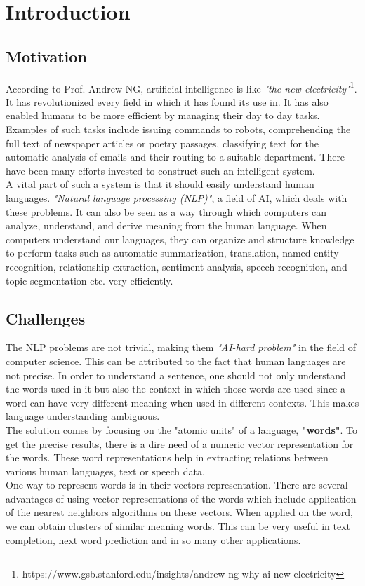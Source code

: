 \chapter{Introduction}
\label{cha:intro}

\section{Motivation}
According to Prof. Andrew NG, artificial intelligence is like \textit{"the new electricity"}\footnote{https://www.gsb.stanford.edu/insights/andrew-ng-why-ai-new-electricity}. It has revolutionized every field in which it has found its use in. It has also enabled humans to be more efficient by managing their day to day tasks. Examples of such tasks include issuing commands to robots, comprehending the full text of newspaper articles or poetry passages, classifying text for the automatic analysis of emails and their routing to a suitable department. There have been many efforts invested to construct such an intelligent system.\\
A vital part of such a system is that it should easily understand human languages. \textit{"Natural language processing (NLP)"}, a field of AI, which deals with these problems. It can also be seen as a way through which computers can analyze, understand, and derive meaning from the human language. When computers understand our languages, they can organize and structure knowledge to perform tasks such as automatic summarization, translation, named entity recognition, relationship extraction, sentiment analysis, speech recognition, and topic segmentation etc. very efficiently.\\

\section{Challenges}
The NLP problems are not trivial, making them \textit{"AI-hard problem"} in the field of computer science. This can be attributed to the fact that human languages are not precise. In order to understand a sentence, one should not only understand the words used in it but also the context in which those words are used since a word can have very different meaning when used in different contexts. This makes language understanding ambiguous.\\
The solution comes by focusing on the "atomic units" of a language, \textbf{"words"}. To get the precise results, there is a dire need of a numeric vector representation for the words. These word representations help in extracting relations between various human languages, text or speech data. \\
One way to represent words is in their vectors representation. There are several advantages of using vector representations of the words which include application of the nearest neighbors algorithms on these vectors. When applied on the word, we can obtain clusters of similar meaning words. This can be very useful in text completion, next word prediction and in so many other applications.	

